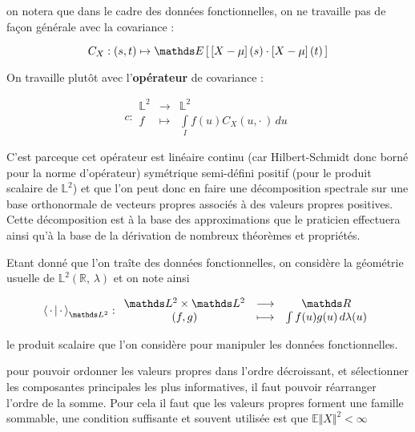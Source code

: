 \begin{rem}
	on notera que dans le cadre des données fonctionnelles, on ne travaille pas de façon générale avec la covariance :

	$$C_X : (s,t) \mapsto \esperance{ \left[X - \mu\right](s) \cdot \left[X - \mu\right](t) }$$

	On travaille plutôt avec l'\textbf{opérateur} de covariance :

	\begin{equation*}
		c : \begin{array}{ccc}
			\mathds L^2 & \longrightarrow & \mathds L^2                             \\
			f           & \longmapsto     & \int\limits_I f(u)C_X(u, \cdot \,) \,du
		\end{array}
	\end{equation*}

	C'est parceque cet opérateur est linéaire continu (car Hilbert-Schmidt donc borné pour la norme d'opérateur) symétrique semi-défini positif (pour le produit scalaire de $\mathds L^2$) et que l'on peut donc en faire une décomposition spectrale sur une base orthonormale de vecteurs propres associés à des valeurs propres positives. Cette décomposition est à la base des approximations que le praticien effectuera ainsi qu'à la base de la dérivation de nombreux théorèmes et propriétés.
\end{rem}

\bigskip

Etant donné que l'on traîte des données fonctionnelles, on considère la géométrie usuelle de $\mathds L^2(\mathds R, \, \lambda)$ et on note ainsi

\begin{equation*}
	\prodscalselon \cdot \cdot {\mathds L^2}: \begin{array}{ccc}
		\mathds L^2 \times \mathds L^2 & \longrightarrow & \mathds R
		\\
		(f,g)                          & \longmapsto     & \int f(u)g(u) \, d\lambda(u)
	\end{array}
\end{equation*}


le produit scalaire que l'on considère pour manipuler les données fonctionnelles.



\begin{rem}
	pour pouvoir ordonner les valeurs propres dans l'ordre décroissant, et sélectionner les composantes principales les plus informatives, il faut pouvoir réarranger l'ordre de la somme. Pour cela il faut que les valeurs propres forment une famille sommable, une condition suffisante et souvent utilisée est que $\mathds E \Vert X \Vert^2 < \infty$
\end{rem}

